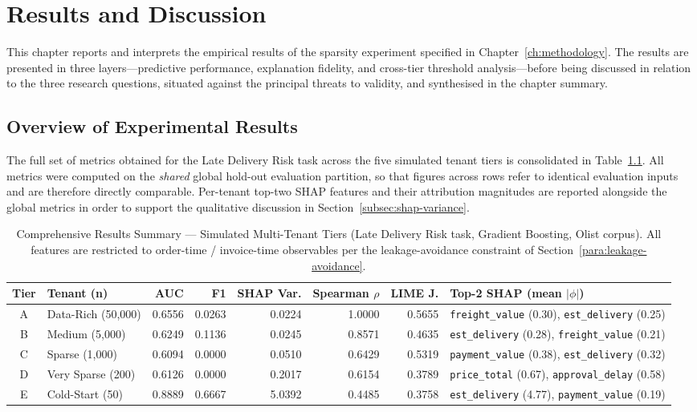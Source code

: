 \chapter{Results and Discussion}
\label{ch:results}

This chapter reports and interprets the empirical results of the sparsity
experiment specified in Chapter~\ref{ch:methodology}. The results are
presented in three layers---predictive performance, explanation fidelity,
and cross-tier threshold analysis---before being discussed in relation to
the three research questions, situated against the principal threats to
validity, and synthesised in the chapter summary.

\section{Overview of Experimental Results}
\label{sec:results-overview}

The full set of metrics obtained for the Late Delivery Risk task across the five
simulated tenant tiers is consolidated in Table~\ref{tab:results-summary}.
All metrics were computed on the \emph{shared} global hold-out evaluation
partition, so that figures across rows refer to identical evaluation inputs
and are therefore directly comparable. Per-tenant top-two SHAP features and
their attribution magnitudes are reported alongside the global metrics in
order to support the qualitative discussion in
Section~\ref{subsec:shap-variance}.

\begin{table}[h]
\centering
\caption{Comprehensive Results Summary --- Simulated Multi-Tenant Tiers
(Late Delivery Risk task, Gradient Boosting, Olist corpus). All features are
restricted to order-time / invoice-time observables per the leakage-avoidance
constraint of Section~\ref{para:leakage-avoidance}.}
\label{tab:results-summary}
\small
\begin{tabularx}{\textwidth}{@{}c l r r r r r X@{}}
\hline
\textbf{Tier} & \textbf{Tenant (n)} & \textbf{AUC} & \textbf{F1} &
\textbf{SHAP Var.} & \textbf{Spearman $\rho$} & \textbf{LIME J.} &
\textbf{Top-2 SHAP (mean $|\phi|$)} \\
\hline
A & Data-Rich (50{,}000)    & 0.6556 & 0.0263 & 0.0224 & 1.0000 & 0.5655 &
\texttt{freight\_value} (0.30), \texttt{est\_delivery} (0.25) \\
B & Medium (5{,}000)        & 0.6249 & 0.1136 & 0.0245 & 0.8571 & 0.4635 &
\texttt{est\_delivery} (0.28), \texttt{freight\_value} (0.21) \\
C & Sparse (1{,}000)        & 0.6094 & 0.0000 & 0.0510 & 0.6429 & 0.5319 &
\texttt{payment\_value} (0.38), \texttt{est\_delivery} (0.32) \\
D & Very Sparse (200)       & 0.6126 & 0.0000 & 0.2017 & 0.6154 & 0.3789 &
\texttt{price\_total} (0.67), \texttt{approval\_delay} (0.58) \\
E & Cold-Start (50)         & 0.8889 & 0.6667 & 5.0392 & 0.4485 & 0.3758 &
\texttt{est\_delivery} (4.77), \texttt{payment\_value} (0.19) \\
\hline
\end{tabularx}
\end{table}

